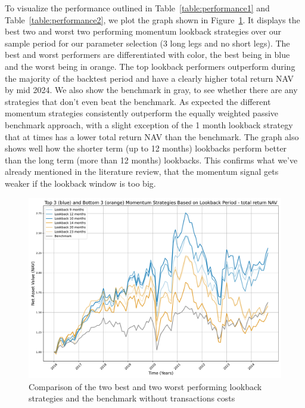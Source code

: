\documentclass[a4paper,12pt,twoside]{article}
\begin{document}
\clearpage

To visualize the performance outlined in Table~\ref{table:performance1} and Table~\ref{table:performance2}, we plot the graph shown in Figure~\ref{fig:bm}. It displays the best two and worst two performing momentum lookback strategies over our sample period for our parameter selection (3 long legs and no short legs). The best and worst performers are differentiated with color, the best being in blue and the worst being in orange. The top lookback performers outperform during the majority of the backtest period and have a clearly higher total return NAV by mid 2024. We also show the benchmark in gray, to see whether there are any strategies that don't even beat the benchmark.  As expected the different momentum strategies consistently outperform the equally weighted passive benchmark approach, with a slight exception of the 1 month lookback strategy that at times has a lower total return NAV than the benchmark. The graph also shows well how the shorter term (up to 12 months) lookbacks perform better than the long term (more than 12 months) lookbacks. This confirms what we've already mentioned in the literature review, that the momentum signal gets weaker if the lookback window is too big.

\begin{figure}[h]
    \centering
    \includegraphics[width=15cm]{figures/fig_bm.pdf}
    \caption{Comparison of the two best and two worst performing lookback strategies and the benchmark without transactions costs}
    \label{fig:bm}
\end{figure}

\clearpage
\end{document}
